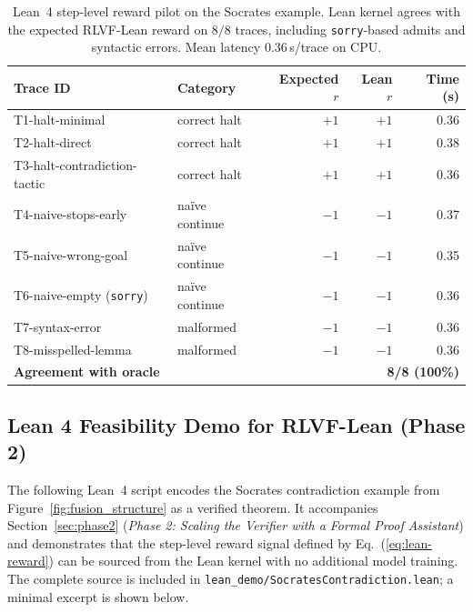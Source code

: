 \documentclass{article} %
\begin{document}
\begin{table}[h]
\centering\small
\caption{Lean~4 step-level reward pilot on the Socrates example. Lean kernel agrees with the expected RLVF-Lean reward on $8/8$ traces, including \texttt{sorry}-based admits and syntactic errors. Mean latency $0.36$\,s/trace on CPU.}
\label{tab:lean_pilot}
\begin{tabular}{llrrr}
\toprule
\textbf{Trace ID} & \textbf{Category} & \textbf{Expected $r$} & \textbf{Lean $r$} & \textbf{Time (s)} \\
\midrule
T1-halt-minimal              & correct halt       & $+1$ & $+1$ & 0.36 \\
T2-halt-direct               & correct halt       & $+1$ & $+1$ & 0.38 \\
T3-halt-contradiction-tactic & correct halt       & $+1$ & $+1$ & 0.36 \\
T4-naive-stops-early         & na\"ive continue   & $-1$ & $-1$ & 0.37 \\
T5-naive-wrong-goal          & na\"ive continue   & $-1$ & $-1$ & 0.35 \\
T6-naive-empty (\texttt{sorry}) & na\"ive continue & $-1$ & $-1$ & 0.36 \\
T7-syntax-error              & malformed          & $-1$ & $-1$ & 0.36 \\
T8-misspelled-lemma          & malformed          & $-1$ & $-1$ & 0.36 \\
\midrule
\multicolumn{2}{l}{\textbf{Agreement with oracle}} & \multicolumn{3}{r}{\textbf{8/8 (100\%)}} \\
\bottomrule
\end{tabular}
\end{table}

\subsection{Lean 4 Feasibility Demo for RLVF-Lean (Phase 2)}
\label{app:lean-demo}

The following Lean~4 script encodes the Socrates contradiction example from
Figure~\ref{fig:fusion_structure} as a verified theorem. It accompanies
Section~\ref{sec:phase2} (\emph{Phase 2: Scaling the Verifier with a Formal
Proof Assistant}) and demonstrates that the step-level reward signal defined
by Eq.~(\ref{eq:lean-reward}) can be sourced from the Lean kernel with no
additional model training. The complete source is included in
\texttt{lean\_demo/SocratesContradiction.lean}; a minimal excerpt is shown
below.
\end{document}
